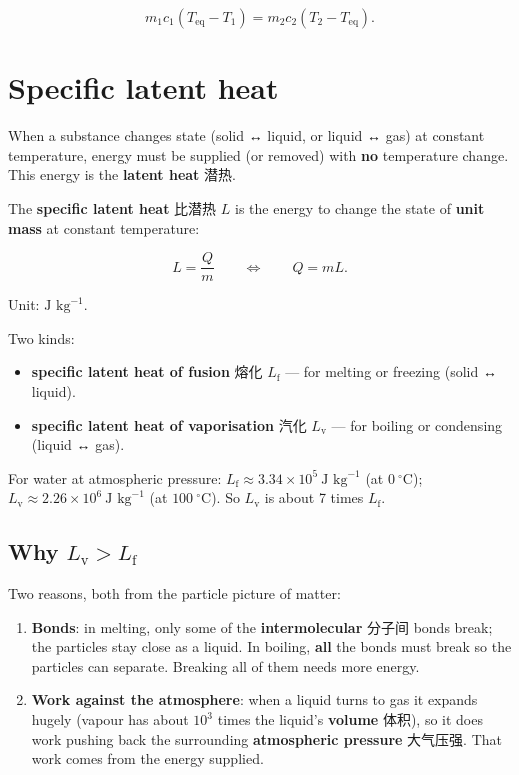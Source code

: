 \documentclass[11pt]{article}
\begin{document}
\[
m_{1} c_{1} (T_{\text{eq}} - T_{1}) = m_{2} c_{2} (T_{2} - T_{\text{eq}}).
\]

\section*{Specific latent heat}

When a substance changes state (solid ↔ liquid, or liquid ↔ gas) at constant temperature, energy must be supplied (or removed) with \textbf{no} temperature change. This energy is the \textbf{latent heat} 潜热.

The \textbf{specific latent heat} 比潜热 $L$ is the energy to change the state of \textbf{unit mass} at constant temperature:

\[
L = \frac{Q}{m} \qquad\Longleftrightarrow\qquad Q = m L.
\]

Unit: $\text{J kg}^{-1}$.

Two kinds:

\begin{itemize}
\item \textbf{specific latent heat of fusion} 熔化 $L_{\text{f}}$ — for melting or freezing (solid ↔ liquid).

\item \textbf{specific latent heat of vaporisation} 汽化 $L_{\text{v}}$ — for boiling or condensing (liquid ↔ gas).

\end{itemize}

For water at atmospheric pressure: $L_{\text{f}} \approx 3.34 \times 10^{5}\ \text{J kg}^{-1}$ (at $0\ ^{\circ}\text{C}$); $L_{\text{v}} \approx 2.26 \times 10^{6}\ \text{J kg}^{-1}$ (at $100\ ^{\circ}\text{C}$). So $L_{\text{v}}$ is about 7 times $L_{\text{f}}$.

\subsection*{Why $L_{\text{v}} > L_{\text{f}}$}

Two reasons, both from the particle picture of matter:

\begin{enumerate}
\item \textbf{Bonds}: in melting, only some of the \textbf{intermolecular} 分子间 bonds break; the particles stay close as a liquid. In boiling, \textbf{all} the bonds must break so the particles can separate. Breaking all of them needs more energy.

\item \textbf{Work against the atmosphere}: when a liquid turns to gas it expands hugely (vapour has about $10^{3}$ times the liquid's \textbf{volume} 体积), so it does work pushing back the surrounding \textbf{atmospheric pressure} 大气压强. That work comes from the energy supplied.

\end{enumerate}
\end{document}
